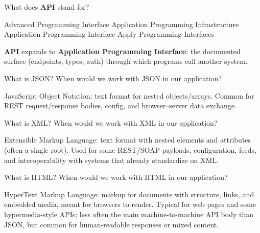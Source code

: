 




\question[4]
What does \textbf{API} stand for?
\begin{choices}
  \choice Advanced Programming Interface
  \choice Application Programming Infrastructure
  \CorrectChoice Application Programming Interface
  \choice Apply Programming Interfaces
\end{choices}
\begin{solution}
  \textbf{API} expands to \textbf{Application Programming Interface}: the documented surface (endpoints, types, auth) through which programs call another system.
\end{solution}

\question[4]
What is JSON? When would we work with JSON in our application?
\makeemptybox{1.00in}
\begin{solution}
  JavaScript Object Notation: text format for nested objects/arrays. Common for REST request/response bodies, config, and browser--server data exchange.
\end{solution}

\question[4]
What is XML? When would we work with XML in our application?
\makeemptybox{1.00in}
\begin{solution}
  Extensible Markup Language: text format with nested elements and attributes (often a single root). Used for some REST/SOAP payloads, configuration, feeds, and interoperability with systems that already standardize on XML.
\end{solution}


\question[4]
What is HTML? When would we work with HTML in our application?
\makeemptybox{1.00in}
\begin{solution}
  HyperText Markup Language: markup for documents with structure, links, and embedded media, meant for browsers to render. Typical for web pages and some hypermedia-style APIs; less often the main machine-to-machine API body than JSON, but common for human-readable responses or mixed content.
\end{solution}


